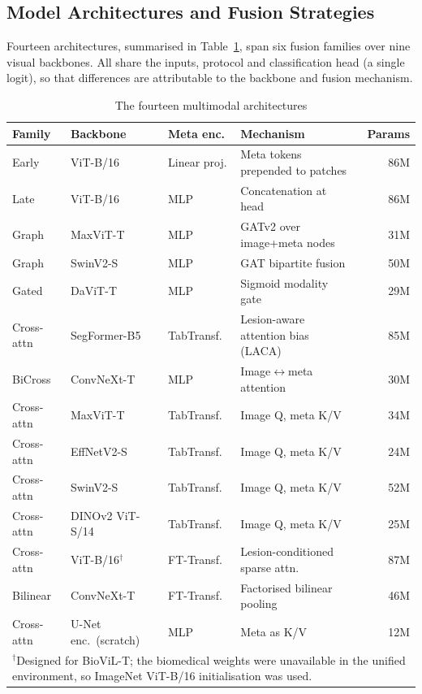 \documentclass[journal]{IEEEtran}
\begin{document}
\subsection{Model Architectures and Fusion Strategies}
Fourteen architectures, summarised in Table~\ref{tab:arch}, span six fusion families over nine visual backbones. All share the inputs, protocol and classification head (a single logit), so that differences are attributable to the backbone and fusion mechanism.

\begin{table}[!t]
\centering
\caption{The fourteen multimodal architectures}
\label{tab:arch}
\scriptsize
\begin{tabular}{p{1.3cm}p{1.75cm}p{1.35cm}p{2.3cm}r}
\toprule
Family & Backbone & Meta enc. & Mechanism & Params\\
\midrule
Early & ViT-B/16 & Linear proj. & Meta tokens prepended to patches & 86M\\
Late & ViT-B/16 & MLP & Concatenation at head & 86M\\
Graph & MaxViT-T & MLP & GATv2 over image+meta nodes & 31M\\
Graph & SwinV2-S & MLP & GAT bipartite fusion & 50M\\
Gated & DaViT-T & MLP & Sigmoid modality gate & 29M\\
Cross-attn & SegFormer-B5 & TabTransf. & Lesion-aware attention bias (LACA) & 85M\\
BiCross & ConvNeXt-T & MLP & Image$\leftrightarrow$meta attention & 30M\\
Cross-attn & MaxViT-T & TabTransf. & Image Q, meta K/V & 34M\\
Cross-attn & EffNetV2-S & TabTransf. & Image Q, meta K/V & 24M\\
Cross-attn & SwinV2-S & TabTransf. & Image Q, meta K/V & 52M\\
Cross-attn & DINOv2 ViT-S/14 & TabTransf. & Image Q, meta K/V & 25M\\
Cross-attn & ViT-B/16$^\dagger$ & FT-Transf. & Lesion-conditioned sparse attn. & 87M\\
Bilinear & ConvNeXt-T & FT-Transf. & Factorised bilinear pooling & 46M\\
Cross-attn & U-Net enc.\ (scratch) & MLP & Meta as K/V & 12M\\
\bottomrule
\multicolumn{5}{p{8.3cm}}{\footnotesize $^\dagger$Designed for BioViL-T; the biomedical weights were unavailable in the unified environment, so ImageNet ViT-B/16 initialisation was used.}
\end{tabular}
\end{table}
\end{document}
